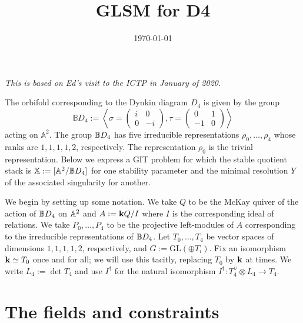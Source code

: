 \documentclass{amsart}
\title{GLSM for D4}
\date{\today}
\theoremstyle{definition}
\begin{document}
\maketitle

\begin{center} {\em This is based on Ed's visit to the ICTP in January of 2020.} \end{center}

The orbifold corresponding to the Dynkin diagram $D_4$ is given by the group 
\[
\mathbb{B}D_4:= \left\langle \sigma=\left(\begin{array}{cc} i & 0 \\ 0 & -i \end{array} \right), \tau=\left( \begin{array}{cc} 0 & 1 \\ -1 & 0 \end{array} \right) \right\rangle
\]
acting on $\mathbb{A}^2$.
The group $\mathbb{B} D_4$ has five irreducible representations $\rho_0, \ldots, \rho_4$ whose ranks are $1,1,1,1,2$, respectively. The representation $\rho_0$ is the trivial representation.
Below we express a GIT problem for which the stable quotient stack is $\mathbb{X}:= [\mathbb{A}^2/ \mathbb{B} D_4]$ for one stability parameter and the minimal resolution $Y$ of the associated singularity for another.

We begin by setting up some notation.
We take $Q$ to be the McKay quiver of the action of $\mathbb{B} D_4$ on $\mathbb{A}^2$ and $A:= \mathbf{k} Q/I$ where $I$ is the corresponding ideal of relations.
We take $P_0, \ldots, P_4$ to be the projective left-modules of $A$ corresponding to the irreducible representations of $\mathbb{B} D_4$.
Let $T_0, \ldots, T_4$ be vector spaces of dimensions $1,1,1,1,2$, respectively, and $G:= \text{GL}(\oplus T_i)$.
Fix an isomorphism $\mathbf{k} \simeq T_0$ once and for all; we will use this tacitly, replacing $T_0$ by $\mathbf{k}$ at times.
We write $L_4:= \det T_4$ and use $I^\dagger$ for the natural isomorphism $I^\dagger \colon T_4^\vee \otimes L_4 \rightarrow T_4$.

\section{The fields and constraints}
\end{document}
